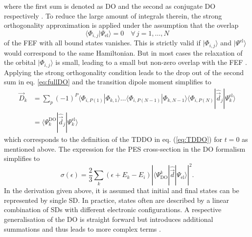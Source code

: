 where the first sum is denoted as DO and the second as conjugate DO respectively \cite{saPonzi}.
To reduce the large amount of integrals therein, the strong orthogonality approximation is applied under the assumption that the overlap 
\begin{equation}
 \langle \Phi_{i,j}  |\Psi_\text{el}\rangle=0 \quad \forall\, j=1,\hdots, N
\end{equation}
of the FEF with all bound states vanishes.
This is strictly valid if $|\Phi_{i,j}\rangle$ and $|\Psi^\text{el}\rangle$ would correspond to the same Hamiltonian.
But in most cases the relaxation of the orbital $|\Phi_{i,j}\rangle$ is small, leading to a small but non-zero overlap with the FEF \cite{saPonzi,GrellKuehn}.
Applying the strong orthogonality condition leads to the drop out of the second sum in eq. \ref{eq:fullDO} and the transition dipole moment simplifies to
\begin{align} \label{eq:sigma_do}
\vec{D}_k&= \sum_p (-1)^P \langle \Phi_{i,P(1)}  |\Phi_{k,1} \rangle
            \hdots  \langle \Phi_{i,P(N-1)}|\Phi_{k,N-1} \rangle
                   \langle \Phi_{i,P(N)} |\hat{\vec{d}}_j |\Psi_k^\text{el}\rangle \nonumber \\
    &= \langle \Psi_k^\text{DO}| \hat{\vec{d}}_j| \Psi_k^\text{el}\rangle
\end{align}
which corresponds to the definition of the TDDO in eq. (\ref{eq:TDDO}) for $t=0$ as mentioned above.
The expression for the PES cross-section in the DO formalism simplifies to
\begin{equation} \label{eq:DO_pes}
\sigma(\epsilon) =\frac 23 \sum_k (\epsilon +E_k-E_i)  
             \left|  \langle \Psi^k_\text{DO} | \hat{\vec{d}} | \Psi_\text{el}\rangle  \right|^2 .
\end{equation}
In the derivation given above, it is assumed that initial and final states can be represented by single SD.
In practice, states often are described by a linear combination of SDs with different electronic configurations.
A respective generalisation of the DO is straight forward but introduces additional summations and thus leads to more complex terms \cite{GrellKuehn}.

